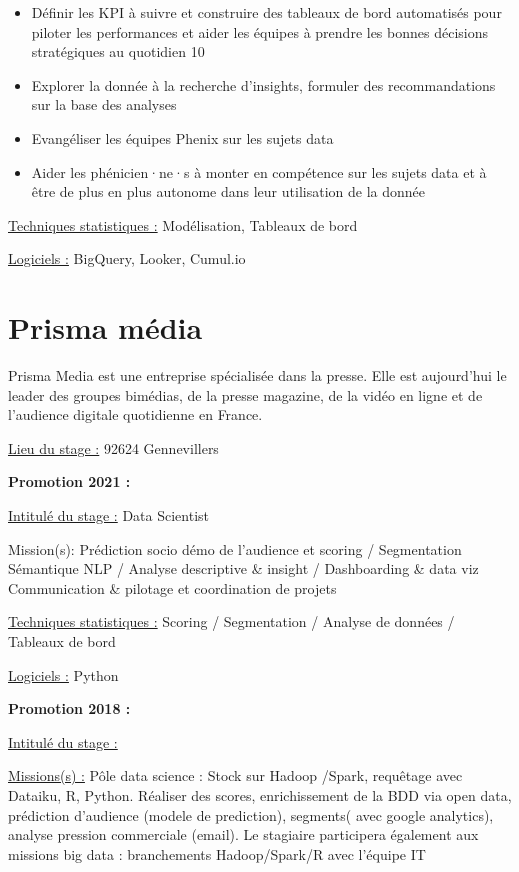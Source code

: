 \documentclass[
  letterpaper,
  DIV=11,
  numbers=noendperiod]{scrreprt}
\begin{document}
\begin{itemize}
\item
  Définir les KPI à suivre et construire des tableaux de bord
  automatisés pour piloter les performances et aider les équipes à
  prendre les bonnes décisions stratégiques au quotidien 10
\item
  Explorer la donnée à la recherche d'insights, formuler des
  recommandations sur la base des analyses
\item
  Evangéliser les équipes Phenix sur les sujets data
\item
  Aider les phénicien·ne·s à monter en compétence sur les sujets data et
  à être de plus en plus autonome dans leur utilisation de la donnée
\end{itemize}

\uline{Techniques statistiques :} Modélisation, Tableaux de bord

\uline{Logiciels :} BigQuery, Looker, Cumul.io

\hypertarget{prisma-muxe9dia}{%
\section{\texorpdfstring{\textbf{Prisma
média}}{Prisma média}}\label{prisma-muxe9dia}}

Prisma Media est une entreprise spécialisée dans la presse. Elle est
aujourd'hui le leader des groupes bimédias, de la presse magazine, de la
vidéo en ligne et de l'audience digitale quotidienne en France.

\uline{Lieu du stage :} 92624 Gennevillers

\textbf{Promotion 2021 :}

\uline{Intitulé du stage :} Data Scientist

Mission(s): Prédiction socio démo de l'audience et scoring /
Segmentation Sémantique NLP / Analyse descriptive \& insight /
Dashboarding \& data viz Communication \& pilotage et coordination de
projets

\uline{Techniques statistiques :} Scoring / Segmentation / Analyse de
données / Tableaux de bord

\uline{Logiciels :} Python

\textbf{Promotion 2018 :}

\uline{Intitulé du stage :}

\uline{Missions(s) :} Pôle data science : Stock sur Hadoop /Spark,
requêtage avec Dataiku, R, Python. Réaliser des scores, enrichissement
de la BDD via open data, prédiction d'audience (modele de prediction),
segments( avec google analytics), analyse pression commerciale (email).
Le stagiaire participera également aux missions big data : branchements
Hadoop/Spark/R avec l'équipe IT
\end{document}
